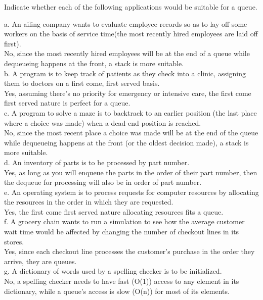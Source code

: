 \documentclass[12pt]{article}
\newenvironment{problem}[2][Problem]{\begin{trivlist}
\item[\hskip \labelsep {\bfseries #1}\hskip \labelsep {\bfseries #2.}]}{\end{trivlist}}
\begin{document}
\pagebreak
\begin{problem}{3}
    Indicate whether each of the following applications would be suitable for a queue.

    a. An ailing company wants to evaluate employee records so as to lay off some workers
    on the basis of service time(the most recently hired employees are laid off first).\\
    No, since the most recently hired employees will be at the end of a queue while dequeueing happens at the front, a stack is more suitable.\\
 
    b. A program is to keep track of patients as they check into a clinic, assigning them to
    doctors on a first come, first served basis.\\
    Yes, assuming there's no priority for emergency or intensive care, the first come first served nature is perfect for a queue.\\

    c. A program to solve a maze is to backtrack to an earlier position (the last place where a choice was made) when a dead-end position is reached.\\
    No, since the most recent place a choice was made will be at the end of the queue while dequeueing happens at the front (or the oldest decision made), a stack is more suitable.\\

    d. An inventory of parts is to be processed by part number.\\
    Yes, as long as you will enqueue the parts in the order of their part number, then the dequeue for processing will also be in order of part number.\\
    
    e. An operating system is to process requests for computer resources by allocating the resources in the order in which they are requested.\\
    Yes, the first come first served nature allocating resources fits a queue.\\

    f. A grocery chain wants to run a simulation to see how the average customer wait time
    would be affected by changing the number of checkout lines in its stores.\\
    Yes, since each checkout line processes the customer's purchase in the order they arrive, they are queues.\\

    g. A dictionary of words used by a spelling checker is to be initialized.\\
    No, a spelling checker needs to have fast (O(1)) access to any element in its dictionary, while a queue's access is slow (O(n)) for most of its elements.\\


\end{problem}
\end{document}
